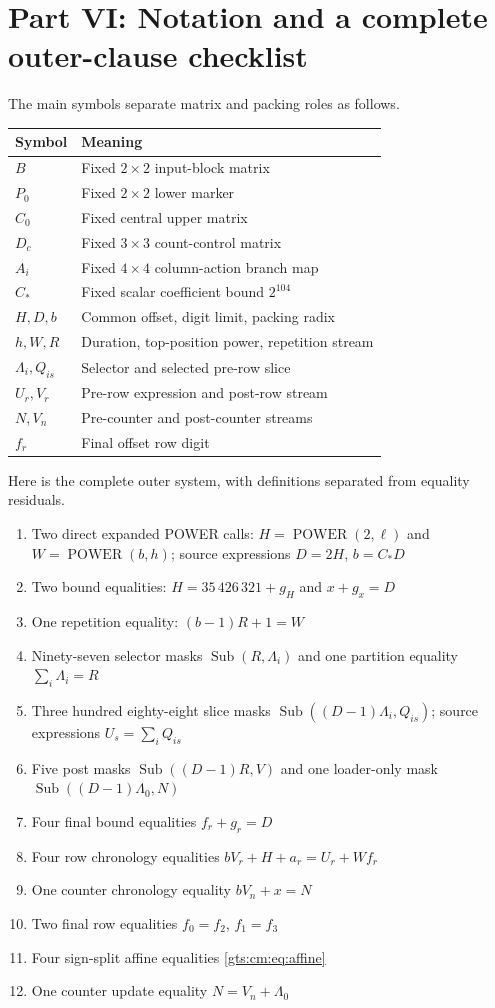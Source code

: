 \documentclass[11pt,letterpaper]{article}
\theoremstyle{definition}
\theoremstyle{remark}
\newcommand{\Pow}{\operatorname{POWER}}
\newcommand{\Sub}{\operatorname{Sub}}
\begin{document}
\section{Part VI: Notation and a complete outer-clause checklist}
\label{gts:cm:app:checklist}
The main symbols separate matrix and packing roles as follows.
\begin{center}
\begin{tabular}{ll}
\toprule
Symbol & Meaning\\
\midrule
$B$ & Fixed $2\times2$ input-block matrix\\
$P_0$ & Fixed $2\times2$ lower marker\\
$C_0$ & Fixed central upper matrix\\
$D_c$ & Fixed $3\times3$ count-control matrix\\
$A_i$ & Fixed $4\times4$ column-action branch map\\
$C_*$ & Fixed scalar coefficient bound $2^{104}$\\
$H,D,b$ & Common offset, digit limit, packing radix\\
$h,W,R$ & Duration, top-position power, repetition stream\\
$\Lambda_i,Q_{is}$ & Selector and selected pre-row slice\\
$U_r,V_r$ & Pre-row expression and post-row stream\\
$N,V_n$ & Pre-counter and post-counter streams\\
$f_r$ & Final offset row digit\\
\bottomrule
\end{tabular}
\end{center}
Here is the complete outer system, with definitions separated from equality residuals.
\begin{enumerate}
\item Two direct expanded POWER calls: $H=\Pow(2,\ell)$ and $W=\Pow(b,h)$; source expressions $D=2H$, $b=C_*D$
\item Two bound equalities: $H=35\,426\,321+g_H$ and $x+g_x=D$
\item One repetition equality: $(b-1)R+1=W$
\item Ninety-seven selector masks $\Sub(R,\Lambda_i)$ and one partition equality $\sum_i\Lambda_i=R$
\item Three hundred eighty-eight slice masks $\Sub((D-1)\Lambda_i,Q_{is})$; source expressions $U_s=\sum_iQ_{is}$
\item Five post masks $\Sub((D-1)R,V)$ and one loader-only mask $\Sub((D-1)\Lambda_0,N)$
\item Four final bound equalities $f_r+g_r=D$
\item Four row chronology equalities $bV_r+H+a_r=U_r+Wf_r$
\item One counter chronology equality $bV_n+x=N$
\item Two final row equalities $f_0=f_2$, $f_1=f_3$
\item Four sign-split affine equalities \eqref{gts:cm:eq:affine}
\item One counter update equality $N=V_n+\Lambda_0$
\end{enumerate}
\end{document}
